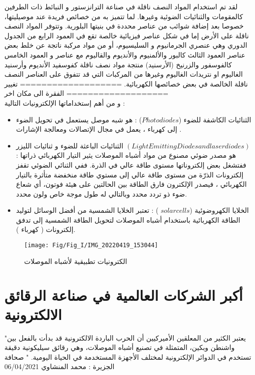 لقد تم استخدام المواد النصف ناقلة في صناعة الترانزستور و النبائط ذات الطرفين كالمقومات والثنائيات الضوئية وغيرها. لما تتميز به من خصائص فريدة عند موصيليتها، خصوصا بعد إضافة شوائب من عناصر محددة في بنيتها البلورية. وتتوفر المواد النصف ناقلة على الأرض إما في شكل عناصر فيزيائية خالصة تقع في العمود الرابع من الجدول الدوري وهي عنصري الجرمانيوم و السليسيوم، أو من مواد مركبة ناتجة عن خلط بعض عناصر العمود الثالث كالبور والألمنيوم والأنديوم والقاليوم مع عناصر و العمود الخامس كالفوسفور والزرنيخ 
(الأرسنيد) منتجة مواد نصف ناقلة كفوسفيد الأنديوم وأرسنيد الغاليوم او نتريدات الغاليوم وغيرها من المركبات التي قد تتفوق على العناصر النصف ناقلة الخالصة في بعض خصائصها الكهربائية.
===================
تغيير الفقرة الى مكان اخر
===================\\
و من أهم إستخداماتها الإلكترونيات التالية :
\begin{itemize}
	\item 
	الثنائيات الكاشفة للضوء ($  ‫‪Photodiodes‬‬  $) : هو شبه موصل يستعمل في تحويل الضوء إلى كهرباء ، يعمل في مجال الإتصالات ومعالجة الإشارات . \cite{a15}
	\item
	الثنائيات الباعثة للضوء و ثنائيات الليزر ‫‪$ (Light‬‬ ‫‪Emitting‬‬ ‫‪Diodes‬‬ and‬ ‫‪laser‬‬ ‫‪diodes‬‬ ) $ :  هو مصدر ضوئي مصنوع من مواد أشباه الموصلات يثير التيار الكهربائي ذراتها ففتشغل بعض إلكتروناتها مستوى طاقة عالي في الذرة. ففي الثنائي الضوئي تقفز إلكترونات الذرّة من مستوى طاقة عالي إلى مستوي طاقة منخفضة متأثرة بالتيار الكهربائي ، فيصدر الإلكترون فارق الطاقة بين الحالتين على هيئة فوتون، أي شعاع ضوء ذو تردد محدد وبالتالي له طول موجة خاص ولون محدد. \cite{a16}
	\item
	الخلايا الكهروضوئية ($  solar cells  $ ) : تعتبر الخلايا الشمسية من أفضل الوسائل لتوليد الطاقة الكهربائية باستخدام أشباه الموصلات لتحويل الطاقة الشمسية إلى تدفق إلكترونات ( كهرباء ). \cite{a17}
\end{itemize}

\begin{figure}[h]
	\centering
		\texttt{[image: Fig/Fig\_I/IMG\_20220419\_153044]}
	\caption{الكترونيات تطبيقية لأشباه الموصلات}
	\label{fig:img20220419153044}
\end{figure}
\FloatBarrier

\section { أكبر الشركات العالمية في صناعة الرقائق الالكترونية }

"يعتبر الكثير من المعلقين الأميركيين أن الحرب الباردة الالكترونية قد بدأت بالفعل بين واشنطن وبكين، المتمثلة في تصنيع أشباه الموصلات، وهي رقائق سيليكونية دقيقة تستخدم في الدوائر الإلكترونية لمختلف الأجهزة المستخدمة في الحياة اليومية. "  صحافة الجزيرة : محمد المنشاوي 06/04/2021 \\


